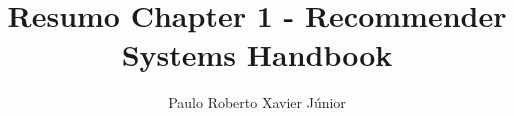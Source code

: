 \documentclass[a4paper,11pt]{article}
\begin{document}
\title{Resumo Chapter 1 - Recommender Systems Handbook}
\author{Paulo Roberto Xavier Júnior}
\def\email{contato.pauloxavier@gmail.com}
\def\handindate{18/09/2016}

\maketitle





\end{document}
